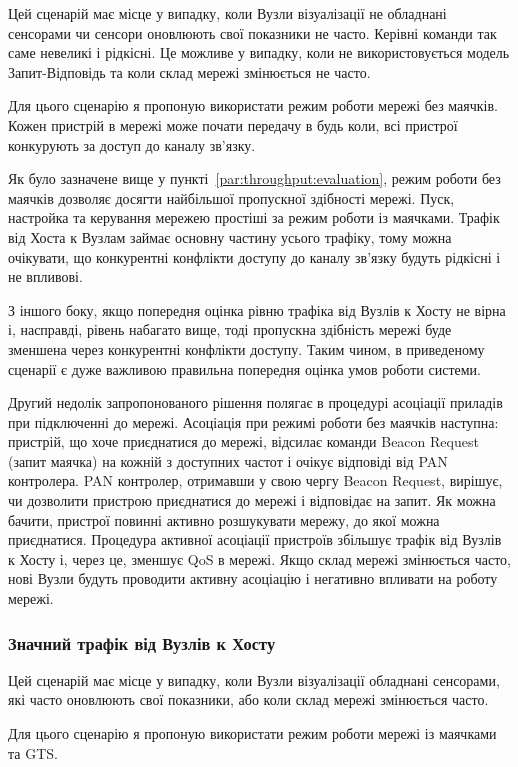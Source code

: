 \documentclass[a4paper,ukrainian,utf8,nocolumnsxix,floatsection,equationsection]{eskdtext}
\renewcommand\paragraph{\subsubsection}
\begin{document}
Цей сценарій має місце у випадку, коли Вузли візуалізації не обладнані сенсорами чи сенсори оновлюють свої показники не часто. Керівні команди так саме невеликі і рідкісні. Це можливе у випадку, коли не використовується модель Запит-Відповідь та коли склад мережі змінюється не часто.

Для цього сценарію я пропоную використати режим роботи мережі без маячків. Кожен пристрій в мережі може почати передачу в будь коли, всі пристрої конкурують за доступ до каналу зв’язку. 

Як було зазначене вище у пункті~\ref{par:throughput:evaluation}, режим роботи без маячків дозволяє досягти найбільшої пропускної здібності мережі. Пуск, настройка та керування мережею простіші за режим роботи із маячками. Трафік від Хоста к Вузлам займає основну частину усього трафіку, тому можна очікувати, що конкурентні конфлікти доступу до каналу зв’язку будуть рідкісні і не впливові.

З іншого боку, якщо попередня оцінка рівню трафіка від Вузлів к Хосту не вірна і, насправді, рівень набагато вище, тоді пропускна здібність мережі буде зменшена через конкурентні конфлікти доступу. Таким чином, в приведеному сценарії є дуже важливою правильна попередня оцінка умов роботи системи.

Другий недолік запропонованого рішення полягає в процедурі асоціації приладів при підключенні до мережі. Асоціація при режимі роботи без маячків наступна: пристрій, що хоче приєднатися до мережі, відсилає команди Beacon Request (запит маячка) на кожній з доступних частот і очікує відповіді від PAN контролера. PAN контролер, отримавши  у свою чергу Beacon Request, вирішує, чи дозволити пристрою приєднатися до мережі і відповідає на запит. Як можна бачити, пристрої повинні активно розшукувати мережу, до якої можна приєднатися. Процедура активної асоціації пристроїв збільшує трафік від Вузлів к Хосту і, через це, зменшує QoS в мережі. Якщо склад мережі змінюється часто, нові Вузли будуть проводити активну асоціацію і негативно впливати на роботу мережі.

\paragraph{Значний трафік від Вузлів к Хосту}
\label{par:high:ntht}

Цей сценарій має місце у випадку, коли Вузли візуалізації обладнані сенсорами, які часто  оновлюють свої показники, або коли склад мережі змінюється часто.

Для цього сценарію я пропоную використати режим роботи мережі із маячками та GTS.
\end{document}
